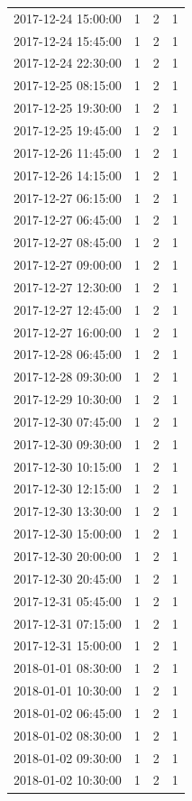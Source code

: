 \begin{tabular}{lrrr}
2017-12-24 15:00:00 & 1 & 2 & 1 \\
2017-12-24 15:45:00 & 1 & 2 & 1 \\
2017-12-24 22:30:00 & 1 & 2 & 1 \\
2017-12-25 08:15:00 & 1 & 2 & 1 \\
2017-12-25 19:30:00 & 1 & 2 & 1 \\
2017-12-25 19:45:00 & 1 & 2 & 1 \\
2017-12-26 11:45:00 & 1 & 2 & 1 \\
2017-12-26 14:15:00 & 1 & 2 & 1 \\
2017-12-27 06:15:00 & 1 & 2 & 1 \\
2017-12-27 06:45:00 & 1 & 2 & 1 \\
2017-12-27 08:45:00 & 1 & 2 & 1 \\
2017-12-27 09:00:00 & 1 & 2 & 1 \\
2017-12-27 12:30:00 & 1 & 2 & 1 \\
2017-12-27 12:45:00 & 1 & 2 & 1 \\
2017-12-27 16:00:00 & 1 & 2 & 1 \\
2017-12-28 06:45:00 & 1 & 2 & 1 \\
2017-12-28 09:30:00 & 1 & 2 & 1 \\
2017-12-29 10:30:00 & 1 & 2 & 1 \\
2017-12-30 07:45:00 & 1 & 2 & 1 \\
2017-12-30 09:30:00 & 1 & 2 & 1 \\
2017-12-30 10:15:00 & 1 & 2 & 1 \\
2017-12-30 12:15:00 & 1 & 2 & 1 \\
2017-12-30 13:30:00 & 1 & 2 & 1 \\
2017-12-30 15:00:00 & 1 & 2 & 1 \\
2017-12-30 20:00:00 & 1 & 2 & 1 \\
2017-12-30 20:45:00 & 1 & 2 & 1 \\
2017-12-31 05:45:00 & 1 & 2 & 1 \\
2017-12-31 07:15:00 & 1 & 2 & 1 \\
2017-12-31 15:00:00 & 1 & 2 & 1 \\
2018-01-01 08:30:00 & 1 & 2 & 1 \\
2018-01-01 10:30:00 & 1 & 2 & 1 \\
2018-01-02 06:45:00 & 1 & 2 & 1 \\
2018-01-02 08:30:00 & 1 & 2 & 1 \\
2018-01-02 09:30:00 & 1 & 2 & 1 \\
2018-01-02 10:30:00 & 1 & 2 & 1 \\

\end{tabular}
